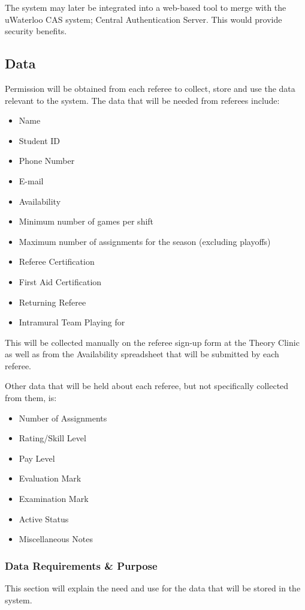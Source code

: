 \documentclass{article}
\begin{document}
The system may later be integrated into a web-based tool to merge with the uWaterloo CAS system; Central Authentication Server. This would provide security benefits.

\subsection{Data}
Permission will be obtained from each referee to collect, store and use the data relevant to the system. The data that will be needed from referees include:
\begin{itemize}
\item Name
\item Student ID
\item Phone Number
\item E-mail
\item Availability
\item Minimum number of games per shift
\item Maximum number of assignments for the season (excluding playoffs)
\item Referee Certification
\item First Aid Certification
\item Returning Referee
\item Intramural Team Playing for
\end{itemize}
This will be collected manually on the referee sign-up form at the Theory Clinic as well as from the Availability spreadsheet that will be submitted by each referee.

Other data that will be held about each referee, but not specifically collected from them, is:
\begin{itemize}
\item Number of Assignments
\item Rating/Skill Level
\item Pay Level
\item Evaluation Mark
\item Examination Mark
\item Active Status
\item Miscellaneous Notes
\end{itemize}

\subsubsection{Data Requirements \& Purpose}
This section will explain the need and use for the data that will be stored in the system.
\end{document}

